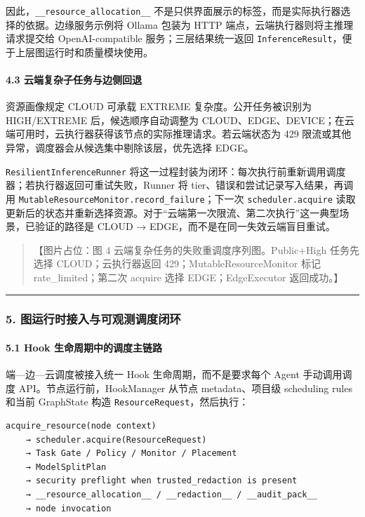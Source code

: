 \documentclass[UTF8,a4paper,12pt]{ctexart}
\begin{document}
因此，\texttt{\_\_resource\_allocation\_\_} 不是只供界面展示的标签，而是实际执行器选择的依据。边缘服务示例将 Ollama 包装为 HTTP 端点，云端执行器则将主推理请求提交给 OpenAI-compatible 服务；三层结果统一返回 \texttt{InferenceResult}，便于上层图运行时和质量模块使用。

\paragraph{4.3 云端复杂子任务与边侧回退}

资源画像规定 CLOUD 可承载 EXTREME 复杂度。公开任务被识别为 HIGH/EXTREME 后，候选顺序自动调整为 CLOUD、EDGE、DEVICE；在云端可用时，云执行器获得该节点的实际推理请求。若云端状态为 429 限流或其他异常，调度器会从候选集中剔除该层，优先选择 EDGE。

\texttt{ResilientInferenceRunner} 将这一过程封装为闭环：每次执行前重新调用调度器；若执行器返回可重试失败，Runner 将 tier、错误和尝试记录写入结果，再调用 \texttt{MutableResourceMonitor.record\_failure}；下一次 \texttt{scheduler.acquire} 读取更新后的状态并重新选择资源。对于``云端第一次限流、第二次执行''这一典型场景，已验证的路径是 CLOUD → EDGE，而不是在同一失效云端盲目重试。

\begin{quote}
【图片占位：图 4 云端复杂任务的失败重调度序列图。Public+High 任务先选择 CLOUD；云执行器返回 429；MutableResourceMonitor 标记 rate\_limited；第二次 acquire 选择 EDGE；EdgeExecutor 返回成功。】
\end{quote}

\begin{center}\rule{0.5\linewidth}{0.5pt}\end{center}

\subsubsection{5. 图运行时接入与可观测调度闭环}

\paragraph{5.1 Hook 生命周期中的调度主链路}

端—边—云调度被接入统一 Hook 生命周期，而不是要求每个 Agent 手动调用调度 API。节点运行前，HookManager 从节点 metadata、项目级 scheduling rules 和当前 GraphState 构造 \texttt{ResourceRequest}，然后执行：

\begin{verbatim}
acquire_resource(node context)
    → scheduler.acquire(ResourceRequest)
    → Task Gate / Policy / Monitor / Placement
    → ModelSplitPlan
    → security preflight when trusted_redaction is present
    → __resource_allocation__ / __redaction__ / __audit_pack__
    → node invocation
\end{verbatim}
\end{document}
